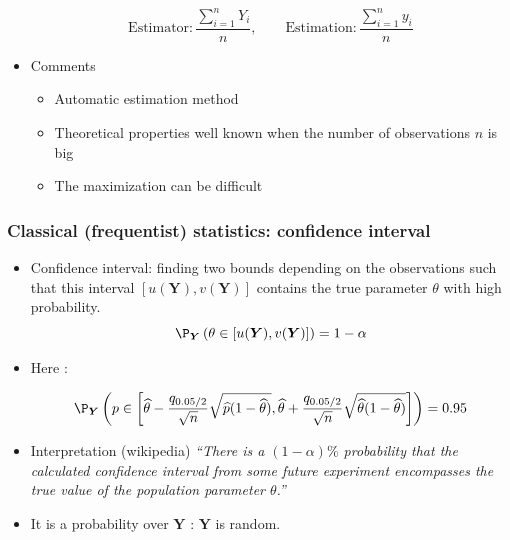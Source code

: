 \begin{frame}[allowframebreaks]
\begin{itemize}
\begin{eqnarray*}
\end{eqnarray*}
% 
\vspace{1em}
% 
$$ \mbox{Estimator}:   \frac{\sum_{i=1}^n Y_i}{n}, \quad \quad \mbox{Estimation}:  \frac{\sum_{i=1}^n y_i}{n} $$
 \item  \vert Comments \noir
 \begin{itemize}
 \item Automatic estimation method 
 \item Theoretical properties well known when the number of observations $n$ is big
 \item The  maximization can be difficult
 \end{itemize}
\end{itemize}
\end{frame}


\begin{frame}\frametitle{Classical (frequentist) statistics: confidence interval}

 
 \begin{itemize}
 \item \vert Confidence interval\noir: finding two bounds depending on the observations such that this interval $[u(\boldsymbol{Y}), v(\boldsymbol{Y})]$ contains the true parameter $\theta$ with high probability.
 $$  \P_{\boldsymbol{Y}}\left(\theta \in [u(\boldsymbol{Y}),v(\boldsymbol{Y})]\right) = 1- \alpha$$ 
  
 
\item \vert Here \noir: 

$$\P_{\boldsymbol{Y}}\left(p \in \left[\widehat{\theta} - \frac{q_{0.05/2}}{\sqrt{n}} \sqrt{ \widehat{p}(1- \widehat{\theta})}, \widehat{\theta} + \frac{q_{0.05/2}}{\sqrt{n}} \sqrt{\widehat{\theta}(1- \widehat{\theta})} \right]\right) = 0.95 $$
\item \vert Interpretation \noir  (wikipedia) \textit{``There is a $(1-\alpha)\%$ probability that the calculated confidence interval from some future experiment encompasses the true value of the population parameter $\theta$.''}

\item It is a probability over $\boldsymbol{Y}$ : $\boldsymbol{Y}$ is  random. 

 \end{itemize}
 \end{frame}


